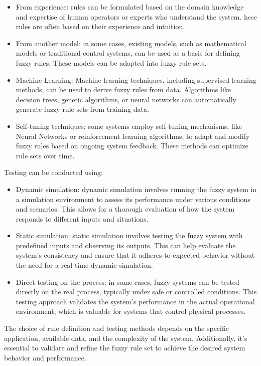 \begin{itemize}
    \item From experience: rules can be formulated based on the domain knowledge and expertise of human operators or experts who understand the system. 
        hese rules are often based on their experience and intuition.
    \item From another model: in some cases, existing models, such as mathematical models or traditional control systems, can be used as a basis for defining fuzzy rules.
        These models can be adapted into fuzzy rule sets.
    \item Machine Learning: Machine learning techniques, including supervised learning methods, can be used to derive fuzzy rules from data. 
        Algorithms like decision trees, genetic algorithms, or neural networks can automatically generate fuzzy rule sets from training data.
    \item Self-tuning techniques: some systems employ self-tuning mechanisms, like Neural Networks or reinforcement learning algorithms, to adapt and modify fuzzy rules based on ongoing system feedback. 
        These methods can optimize rule sets over time.
\end{itemize}
Testing can be conducted using:
\begin{itemize}
    \item Dynamic simulation: dynamic simulation involves running the fuzzy system in a simulation environment to assess its performance under various conditions and scenarios. 
        This allows for a thorough evaluation of how the system responds to different inputs and situations.
    \item Static simulation: static simulation involves testing the fuzzy system with predefined inputs and observing its outputs. 
        This can help evaluate the system's consistency and ensure that it adheres to expected behavior without the need for a real-time dynamic simulation.
    \item Direct testing on the process: in some cases, fuzzy systems can be tested directly on the real process, typically under safe or controlled conditions. 
        This testing approach validates the system's performance in the actual operational environment, which is valuable for systems that control physical processes.
\end{itemize}
The choice of rule definition and testing methods depends on the specific application, available data, and the complexity of the system. 
Additionally, it's essential to validate and refine the fuzzy rule set to achieve the desired system behavior and performance.